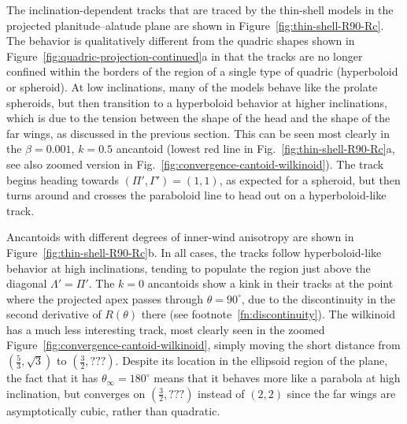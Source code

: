 The inclination-dependent tracks that are traced by the thin-shell
models in the projected planitude--alatude plane are shown in
Figure~\ref{fig:thin-shell-R90-Rc}.  The behavior is qualitatively
different from the quadric shapes shown in
Figure~\ref{fig:quadric-projection-continued}a in that the tracks are
no longer confined within the borders of the region of a single type
of quadric (hyperboloid or spheroid). At low inclinations, many of the
models behave like the prolate spheroids, but then transition to a
hyperboloid behavior at higher inclinations, which is due to the
tension between the shape of the head and the shape of the far wings,
as discussed in the previous section. This can be seen most clearly in
the \(\beta = 0.001\), \(k = 0.5\) ancantoid (lowest red line in
Fig.~\ref{fig:thin-shell-R90-Rc}a, see also zoomed version in
Fig.~\ref{fig:convergence-cantoid-wilkinoid}). The track begins
heading towards \((\Pi', \Gamma') = (1, 1)\), as expected for a spheroid, but
then turns around and crosses the paraboloid line to head out on a
hyperboloid-like track.

Ancantoids with different degrees of inner-wind anisotropy are shown
in Figure~\ref{fig:thin-shell-R90-Rc}b.  In all cases, the tracks
follow hyperboloid-like behavior at high inclinations, tending to
populate the region just above the diagonal \(\Lambda' = \Pi'\).  The
\(k = 0\) ancantoids show a kink in their tracks at the point where
the projected apex passes through \(\theta = 90^\circ\), due to the
discontinuity in the second derivative of \(R(\theta)\) there (see
footnote~\ref{fn:discontinuity}).  The wilkinoid has a much less
interesting track, most clearly seen in the zoomed
Figure~\ref{fig:convergence-cantoid-wilkinoid}, simply moving the
short distance from \((\tfrac53, \sqrt3)\) to
\((\tfrac32, \mathbf{???})\).  Despite its location in the ellipsoid
region of the plane, the fact that it has \(\theta_\infty = 180^\circ\) means that it
behaves more like a parabola at high inclination, but converges on
\((\tfrac32, \mathbf{???})\) instead of \((2, 2)\) since the far wings
are asymptotically cubic, rather than quadratic.

